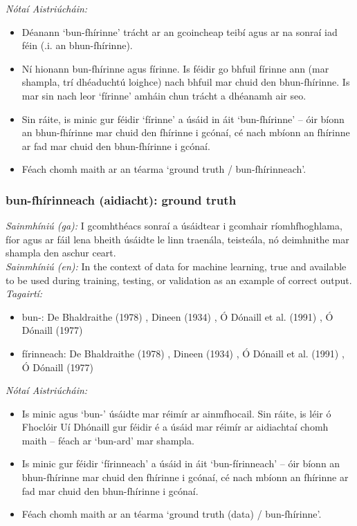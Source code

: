  \noindent \textit{Nótaí Aistriúcháin:}
\begin{itemize}
	\item Déanann `bun-fhírinne' trácht ar an gcoincheap teibí agus ar na sonraí iad féin (.i. an bhun-fhírinne). 
	\item Ní hionann bun-fhírinne agus fírinne. Is féidir go bhfuil fírinne ann (mar shampla, trí dhéaduchtú loighce) nach bhfuil mar chuid den bhun-fhírinne. Is mar sin nach leor `fírinne' amháin chun trácht a dhéanamh air seo.
	\item Sin ráite, is minic gur féidir `fírinne' a úsáid in áit `bun-fhírinne' -- óir bíonn an bhun-fhírinne mar chuid den fhírinne i gcónaí, cé nach mbíonn an fhírinne ar fad mar chuid den bhun-fhírinne i gcónaí.
	\item Féach chomh maith ar an téarma `ground truth / bun-fhírinneach'.
\end{itemize}


\subsubsection*{bun-fhírinneach (aidiacht): ground truth}
 \noindent \textit{Sainmhíniú (ga):} I gcomhthéacs sonraí a úsáidtear i gcomhair ríomhfhoghlama, fíor agus ar fáil lena bheith úsáidte le linn traenála, teisteála, nó deimhnithe mar shampla den aschur ceart.
\\
 \noindent \textit{Sainmhíniú (en):} In the context of data for machine learning, true and available to be used during training, testing, or validation as an example of correct output.
\\
 \noindent \textit{Tagairtí:}
\begin{itemize}
	\item bun-: De Bhaldraithe (1978) \cite{de-bhaldraithe}, Dineen (1934) \cite{dineen}, Ó Dónaill et al. (1991) \cite{focloir-beag}, Ó Dónaill (1977) \cite{odonaill}
	\item fírinneach: De Bhaldraithe (1978) \cite{de-bhaldraithe}, Dineen (1934) \cite{dineen}, Ó Dónaill et al. (1991) \cite{focloir-beag}, Ó Dónaill (1977) \cite{odonaill}
\end{itemize}

 \noindent \textit{Nótaí Aistriúcháin:}
\begin{itemize}
	\item Is minic agus `bun-' úsáidte mar réimír ar ainmfhocail. Sin ráite, is léir ó Fhoclóir Uí Dhónaill gur féidir é a úsáid mar réimír ar aidiachtaí chomh maith -- féach ar `bun-ard' mar shampla.
	\item Is minic gur féidir `fírinneach' a úsáid in áit `bun-fírinneach' -- óir bíonn an bhun-fhírinne mar chuid den fhírinne i gcónaí, cé nach mbíonn an fhírinne ar fad mar chuid den bhun-fhírinne i gcónaí.
	\item Féach chomh maith ar an téarma `ground truth (data) / bun-fhírinne'.
\end{itemize}


